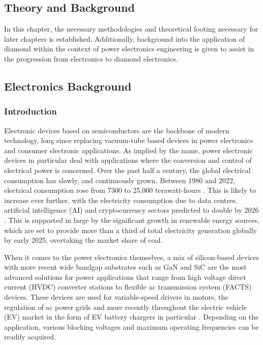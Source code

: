 \begin{refsection}
\chapter{Theory and Background}
\label{ch:theory_and_background}
In this chapter, the necessary methodologies and theoretical footing necessary for later chapters is established. Additionally, background into the application of diamond within the context of power electronics engineering is given to assist in the progression from electronics to diamond electronics.
\section{Electronics Background}
\subsection{Introduction}
Electronic devices based on semiconductors are the backbone of modern technology, long since replacing vacuum-tube based devices in power electronics and consumer electronic applications. As implied by the name, power electronic devices in particular deal with applications where the conversion and control of electrical power is concerned. Over the past half a century, the global electrical consumption has slowly, and continuously grown. Between 1980 and 2022, electrical consumption rose from 7300 to 25,000 terawatt-hours \cite{enerdata2023net}. This is likely to increase ever further, with the electricity consumption due to data centres, artificial intelligence (AI) and cryptocurrency sectors predicted to double by 2026 \cite{IEA2024}. This is supported in large by the significant growth in renewable energy sources, which are set to provide more than a third of total electricity generation globally by early 2025, overtaking the market share of coal.

When it comes to the power electronics themselves, a mix of silicon-based devices with more recent wide bandgap substrates such as GaN and SiC are the most advanced solutions for power applications that range from high voltage direct current (HVDC) converter stations to flexible ac transmission system (FACTS) devices. These devices are used for variable-speed drivers in motors, the regulation of ac power grids and more recently throughout the electric vehicle (EV) market in the form of EV battery chargers in particular \cite{Tolbert2005, Afonso2020}. Depending on the application, various blocking voltages and maximum operating frequencies can be readily acquired.


\end{refsection}
